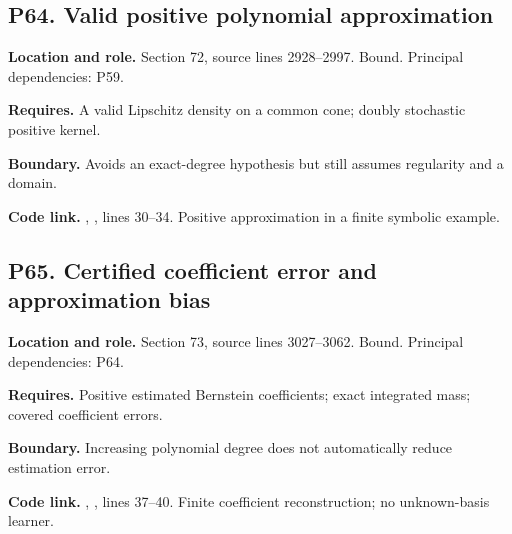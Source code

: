 \documentclass[11pt,oneside,openany]{book}
\numberwithin{equation}{section}
\begin{document}
\par\noindent\begin{minipage}{\textwidth}
\subsection{P64. Valid positive polynomial
approximation}\label{LSMRegister:p64.-valid-positive-polynomial-approximation}

\textbf{Location and role.} Section 72, source lines 2928--2997. Bound.
Principal dependencies: P59.

\textbf{Requires.} A valid Lipschitz density on a common cone; doubly
stochastic positive kernel.

\textbf{Boundary.} Avoids an exact-degree hypothesis but still assumes
regularity and a domain.

\textbf{Code link.} ,
, lines 30--34. Positive approximation in
a finite symbolic example.
\end{minipage}\par\medskip

\par\noindent\begin{minipage}{\textwidth}
\subsection{P65. Certified coefficient error and approximation
bias}\label{LSMRegister:p65.-certified-coefficient-error-and-approximation-bias}

\textbf{Location and role.} Section 73, source lines 3027--3062. Bound.
Principal dependencies: P64.

\textbf{Requires.} Positive estimated Bernstein coefficients; exact
integrated mass; covered coefficient errors.

\textbf{Boundary.} Increasing polynomial degree does not automatically
reduce estimation error.

\textbf{Code link.} ,
, lines 37--40. Finite coefficient
reconstruction; no unknown-basis learner.
\end{minipage}\par\medskip
\end{document}

